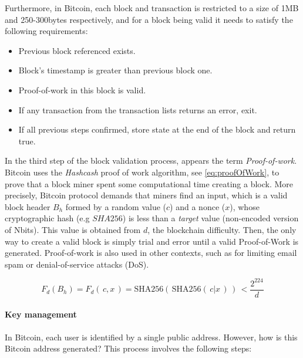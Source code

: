 Furthermore, in Bitcoin, each block and transaction is restricted to a size of 1MB and 250-300bytes respectively, and for a block being valid it needs to satisfy the following requirements:

\begin{itemize}
	\item Previous block referenced exists.
	\item Block's timestamp is greater than previous block one.
	\item Proof-of-work in this block is valid.
	\item If any transaction from the transaction lists returns an error, exit.
	\item If all previous steps confirmed, store state at the end of the block and return true.
\end{itemize}  

In the third step of the block validation process, appears the term \textit{Proof-of-work}. Bitcoin uses the \textit{Hashcash} proof of work algorithm, see \eqref{eq:proofOfWork}, to prove that a block miner spent some computational time creating a block. More precisely, Bitcoin protocol demands that miners find an input, which is a valid block header $B_h$ formed by a random value ($c$) and a nonce ($x$), whose cryptographic hash (e.g $SHA256$) is less than a \textit{target} value (non-encoded version of Nbits). This value is obtained from $d$, the blockchain difficulty. Then, the only way to create a valid block is simply trial and error until a valid Proof-of-Work is generated. Proof-of-work is also used in other contexts, such as for limiting email spam or denial-of-service attacks (DoS).

\begin{equation} \label{eq:proofOfWork}
 F_d(B_h) = F_d( \,c,x \,) = \text{SHA256}( \, \text{SHA256}( \, c|x \,) \,)\, < \frac{2^{224}}{d}
\end{equation}

\paragraph{Key management}

In Bitcoin, each user is identified by a single public address. However, how is this Bitcoin address generated? This process involves the following steps:

